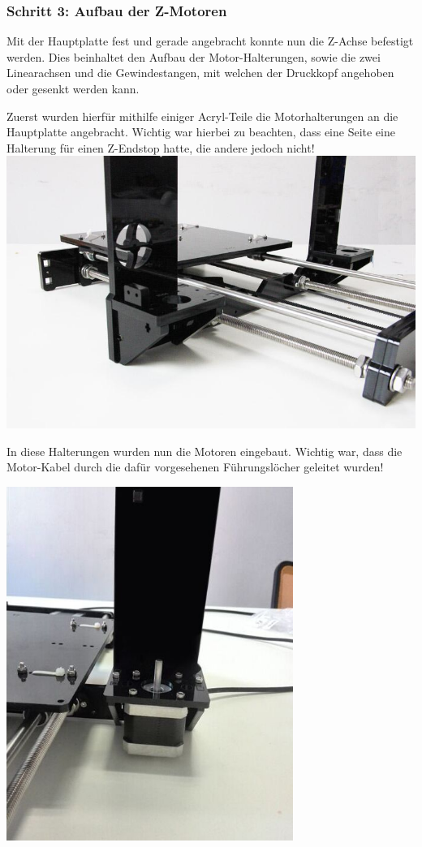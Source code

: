 \subsubsection{Schritt 3: Aufbau der Z-Motoren}
Mit der Hauptplatte fest und gerade angebracht konnte nun die Z-Achse befestigt werden. Dies beinhaltet den Aufbau der Motor-Halterungen, sowie die zwei Linearachsen und die Gewindestangen, mit welchen der Druckkopf angehoben oder gesenkt werden kann.

Zuerst wurden hierfür mithilfe einiger Acryl-Teile die Motorhalterungen an die Hauptplatte angebracht.
Wichtig war hierbei zu beachten, dass eine Seite eine Halterung für einen Z-Endstop hatte, die andere jedoch nicht!\\
\includegraphics[clip=true, trim=30 100 0 0, width=\textwidth]{Bilder/Z_Assembly_3.jpg}

In diese Halterungen wurden nun die Motoren eingebaut. Wichtig war, dass die Motor-Kabel durch die dafür vorgesehenen Führungslöcher geleitet wurden!\\
\begin{center}
\includegraphics[clip=true, trim=30 60 30 130, width=0.7\textwidth]{Bilder/Z_Assembly_4.jpg}
\end{center}

